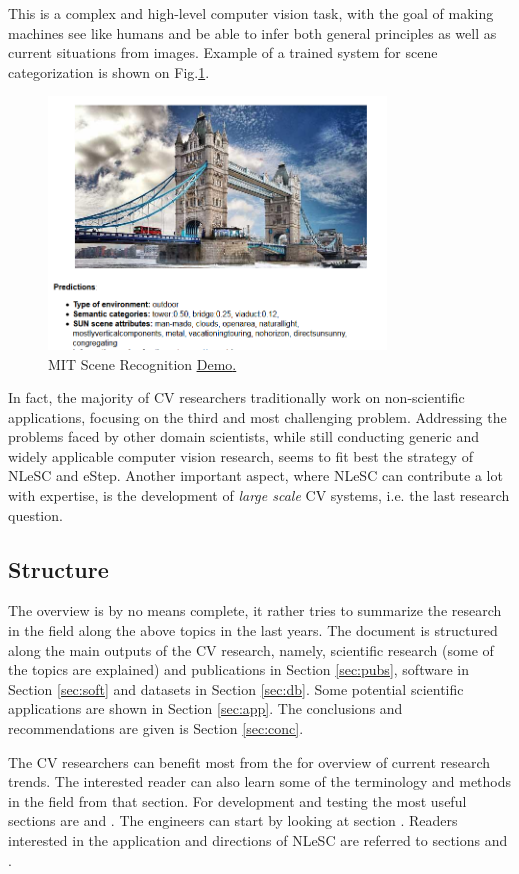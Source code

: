This is a complex and high-level computer vision task, with the goal of making machines see like humans and be able to infer both general principles as well as current situations from images. Example of a trained system for scene categorization is shown on Fig.\ref{fig:mitdemo}.
\begin{figure}[H]
\begin{center}
\includegraphics[width=0.8\textwidth]{fig/mitdemo}
\end{center}
\caption{ MIT Scene Recognition \href{http://places.csail.mit.edu/demo.html}{\underline{Demo}.}}
\label{fig:mitdemo}
\end{figure}

In fact, the majority of CV researchers traditionally work on non-scientific applications, focusing on the third and most challenging problem. Addressing the problems faced by other domain scientists, while still conducting generic and widely applicable computer vision research, seems to fit best the strategy of NLeSC and eStep. Another important aspect, where NLeSC can contribute a lot with expertise, is the development of {\em large scale} CV systems, i.e. the last research question.

\subsection{Structure}
The overview is by no means complete, it rather tries to summarize the research in the field along the above topics in the last years. The document is structured along the main outputs of the CV research, namely, scientific research (some of the topics are explained) and publications in Section \ref{sec:pubs}, software in Section \ref{sec:soft} and datasets in Section \ref{sec:db}. Some potential scientific applications are shown in Section \ref{sec:app}. The conclusions and recommendations are given is Section \ref{sec:conc}.

The CV researchers can benefit most from the \underline{} for overview of current research trends. The interested reader can also learn some of the terminology and methods in the field from that section.  For development and testing the most useful sections are \underline{} and \underline{}.
The engineers can start by looking at section \underline{}.
Readers interested in the application and directions of NLeSC are referred to sections \underline{} and \underline{}.
